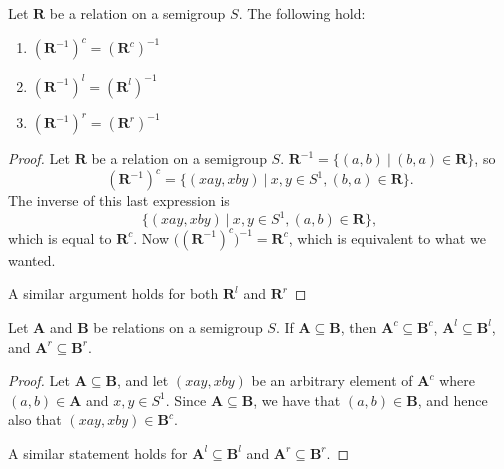 \begin{lemma}
  \label{lem:cinverse}
  Let $\mathbf{R}$ be a relation on a semigroup $S$.
  The following hold:
  \begin{enumerate}
  \item $(\mathbf{R}^{-1})^c = (\mathbf{R}^c)^{-1}$
  \item $(\mathbf{R}^{-1})^l = (\mathbf{R}^l)^{-1}$
  \item $(\mathbf{R}^{-1})^r = (\mathbf{R}^r)^{-1}$
  \end{enumerate}
  \begin{proof}
    Let $\mathbf{R}$ be a relation on a semigroup $S$.
    $\mathbf{R}^{-1} = \{(a,b)~|~(b,a)\in\mathbf{R}\}$, so
    $$(\mathbf{R}^{-1})^c = \{(xay,xby)~|~x,y \in S^1, (b,a)\in\mathbf{R}\}.$$
    The inverse of this last expression is
    $$\{(xay,xby)~|~x,y \in S^1, (a,b)\in\mathbf{R}\},$$
    which is equal to $\mathbf{R}^c$.
    Now $\big((\mathbf{R}^{-1})^c\big)^{-1} = \mathbf{R}^c$, which is equivalent
    to what we wanted.

    A similar argument holds for both $\mathbf{R}^l$ and $\mathbf{R}^r$
  \end{proof}
\end{lemma}

\begin{lemma}
  \label{lem:csubset}
  Let $\mathbf{A}$ and $\mathbf{B}$ be relations on a semigroup $S$.  If
  $\mathbf{A} \subseteq \mathbf{B}$, then $\mathbf{A}^c \subseteq \mathbf{B}^c$,
  $\mathbf{A}^l \subseteq \mathbf{B}^l$, and
  $\mathbf{A}^r \subseteq \mathbf{B}^r$.
  \begin{proof}
    Let $\mathbf{A} \subseteq \mathbf{B}$, and let $(xay,xby)$ be an arbitrary
    element of $\mathbf{A}^c$ where $(a,b) \in \mathbf{A}$ and $x,y \in S^1$.
    Since $\mathbf{A} \subseteq \mathbf{B}$, we have that $(a,b) \in
    \mathbf{B}$, and hence also that $(xay,xby) \in \mathbf{B}^c$.

    A similar statement holds for $\mathbf{A}^l \subseteq \mathbf{B}^l$ and
    $\mathbf{A}^r \subseteq \mathbf{B}^r$.
  \end{proof}
\end{lemma}

